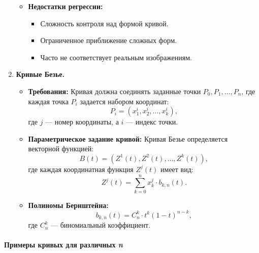 \begin{enumerate}[label=\textbf{\arabic*.}, leftmargin=1.5em]
\begin{itemize}
\begin{itemize}
                    \end{itemize}
              \item \textbf{Недостатки регрессии:}
                    \begin{itemize}
                        \item Сложность контроля над формой кривой.
                        \item Ограниченное приближение сложных форм.
                        \item Часто не соответствует реальным изображениям.
                    \end{itemize}
          \end{itemize}

    \item \textbf{Кривые Безье.}
          \begin{itemize}
              \item \textbf{Требования:}
                    Кривая должна соединять заданные точки \( P_0, P_1, \dots, P_n \), где каждая точка \( P_i \) задается набором координат:
                    \[
                        P_i = (x_1^i, x_2^i, \dots, x_k^i),
                    \]
                    где \( j \) — номер координаты, а \( i \) — индекс точки.

              \item \textbf{Параметрическое задание кривой:}
                    Кривая Безье определяется векторной функцией:
                    \[
                        B(t) = (Z^1(t), Z^2(t), \dots, Z^k(t)),
                    \]
                    где каждая координатная функция \( Z^j(t) \) имеет вид:
                    \[
                        Z^j(t) = \sum_{k=0}^n x_k^j \cdot b_{k,n}(t).
                    \]

              \item \textbf{Полиномы Бернштейна:}
                    \[
                        b_{k,n}(t) = C_n^k \cdot t^k (1-t)^{n-k},
                    \]
                    где \( C_n^k \) — биномиальный коэффициент.

          \end{itemize}

\end{enumerate}

\newpage

\paragraph{Примеры кривых для различных \textit{n}}
